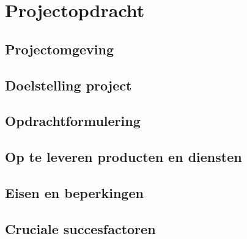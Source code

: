 \section{Projectopdracht}
\subsection{Projectomgeving}
\subsection{Doelstelling project}
\subsection{Opdrachtformulering}
\subsection{Op te leveren producten en diensten}
\subsection{Eisen en beperkingen}
\subsection{Cruciale succesfactoren}
